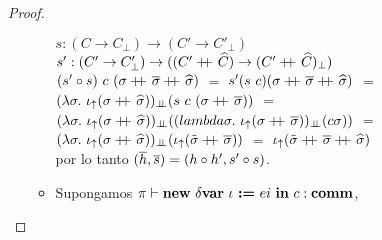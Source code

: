 \begin{proof}
\begin{itemize}
\begin{itemize}
$s : (C \rightarrow C_\bot) \rightarrow (C' \rightarrow C'_\bot)$\\
$s' : (C' \rightarrow C'_\bot) \rightarrow 
   	  ((C' +\kern-1.3ex+\kern0.8ex \widehat{C}) \rightarrow (C' +\kern-1.3ex+\kern0.8ex \widehat{C})_\bot)$\\
$(s' \circ s) \ c \ (\sigma +\kern-1.3ex+\kern0.8ex \overline{\sigma} +\kern-1.3ex+\kern0.8ex \widehat{\sigma})$ $=$
$s' (s \ c) (\sigma +\kern-1.3ex+\kern0.8ex \overline{\sigma} +\kern-1.3ex+\kern0.8ex \widehat{\sigma})$ $=$\\
$(\lambda \sigma. \ \iota_{\uparrow} (\sigma +\kern-1.3ex+\kern0.8ex \widehat{\sigma}))_{\bot \!\!\! \bot}
	(s \ c \ (\sigma +\kern-1.3ex+\kern0.8ex \overline{\sigma}))$ $=$\\
$(\lambda \sigma . \ \iotabot (\sigma \concat \sigmahat))_{\dbot}
((lambda \sigma . \ \iotabot (\sigma \concat \sigmaover))_{\dbot}(c \sigma))$ $=$\\
$(\lambda \sigma . \ \iota_{\uparrow} (\sigma +\kern-1.3ex+\kern0.8ex \widehat{\sigma}))_{\bot \!\!\! \bot}
(\iota_{\uparrow} (\tilde{\sigma} +\kern-1.3ex+\kern0.8ex \overline{\sigma}))$ $=$ 
$\iota_{\uparrow} (\tilde{\sigma} +\kern-1.3ex+\kern0.8ex \overline{\sigma} +\kern-1.3ex+\kern0.8ex \widehat{\sigma})$\\

por lo tanto $(\overline{h},\overline{s}) = (h \circ h',s'\circ s)$.\\

\item Supongamos $\pi \vdash \textbf{new} \ \delta \textbf{var} \ \iota \ \textbf{:=} \ ei \ \textbf{in} \ c : \textbf{comm}$,\\
	

\end{itemize}
\end{itemize}
\end{proof}
